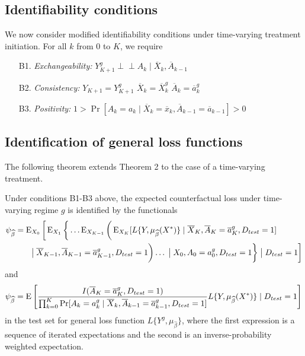 \subsection{Identifiability conditions}
We now consider modified identifiability conditions under time-varying treatment initiation. For all $k$ from 0 to $K$, we require
\begin{enumerate}
    \item[B1.] \textit{Exchangeability:} $Y^g_{K+1} \perp \!\!\! \perp A_k \mid \overline{X}_k, \overline{A}_{k-1}$
    \item[B2.] \textit{Consistency:} $Y_{K+1} = Y^g_{K+1}$ $\overline{X}_{k} = \overline{X}^g_{k}$  $\overline{A}_k = \overline{a}_k^g$
    \item[B3.] \textit{Positivity:} $1 > \Pr[A_k = a_k \mid \overline{X}_k = \overline{x}_k, \overline{A}_{k -1} = \overline{a}_{k-1}] > 0$
\end{enumerate}

\subsection{Identification of general loss functions}
The following theorem extends Theorem 2 to the case of a time-varying treatment. 
\begin{theorem}
    Under conditions B1-B3 above, the expected counterfactual loss under time-varying regime $g$ is identified by the functionals
    \begin{align}\label{eqn:cl_tv_estimand}
    \begin{split}
        \psi_{\widehat{\beta}} &= \operatorname{E}_{X_0}\bigg[\operatorname{E}_{X_1}\bigg\{\ldots \operatorname{E}_{X_{K-1}}\bigg(\operatorname{E}_{X_{K}}[L\{Y, \mu_{\widehat{\beta}}(X^*)\} \mid \overline{X}_K, \overline{A}_K=\overline{a}^g_K, D_{test} = 1] \\
        & \qquad \big\vert\; \overline{X}_{K-1}, \overline{A}_{K-1}=\overline{a}^g_{K-1}, D_{test} = 1\bigg) \ldots \;\big\vert\; X_{0}, A_{0}=a^g_{0}, D_{test} = 1\bigg\}\;\big\vert\; D_{test} = 1\bigg]
    \end{split}
    \end{align}
and 
    \begin{equation}\label{eqn:ipw_tv_estimand}
        \psi_{\widehat{\beta}} = \operatorname{E}\left[\frac{I(\overline{A}_K = \overline{a}^g_K, D_{test} = 1)}{\prod_{k=0}^K\Pr[A_k = a^g_k \mid \overline{X}_k, \overline{A}_{k-1} = \overline{a}^g_{k-1}, D_{test} = 1]}L\{Y, \mu_{\widehat{\beta}}(X^*)\} \mid D_{test} = 1\right]
    \end{equation}
in the test set for general loss function $L\{Y^{g}, \mu_{\widehat{\beta}}\}$, where the first expression is a sequence of iterated expectations and the second is an inverse-probability weighted expectation.
\end{theorem}

